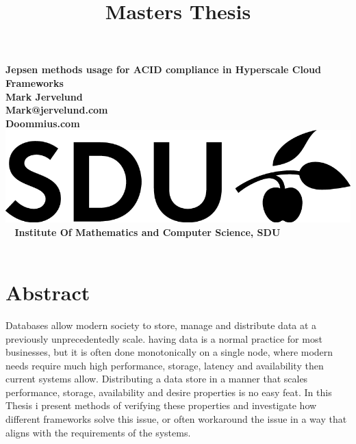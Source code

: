 \documentclass[a4paper,10pt,titlepage]{report}
\date{}
\title{Masters Thesis}
\begin{document}
\begin{titlepage}
\centering
    \vspace*{9\baselineskip}
    \huge
    \bfseries
    Jepsen methods usage for ACID compliance in Hyperscale Cloud Frameworks \\
    \normalfont
    Mark Jervelund \\
    Mark@jervelund.com \\
    Doommius.com \\
    \vspace*{9\baselineskip}
    \normalfont
	\includegraphics[scale=1]{logos/SDU_BLACK.png}
    \vfill\
    \vspace{5mm}
    Institute Of Mathematics and Computer Science, SDU \\

    \textbf{\datedate} \\[2\baselineskip]
\end{titlepage}

\renewcommand{\thepage}{\roman{page}}%
\tableofcontents
\newpage
\setcounter{page}{1}
\renewcommand{\thepage}{\arabic{page}}


\section*{Abstract}

Databases allow modern society to store, manage and distribute data at a previously unprecedentedly scale. having data is a normal practice for most businesses, but it is often done monotonically on a single node, where modern needs require much high performance, storage, latency and  availability then current systems allow. Distributing a data store in a manner that scales performance, storage, availability and desire properties is no easy feat. In this Thesis i present methods of verifying these properties and investigate how different frameworks solve this issue, or often workaround the issue in a way that aligns with the requirements of the systems. \\
\end{document}

